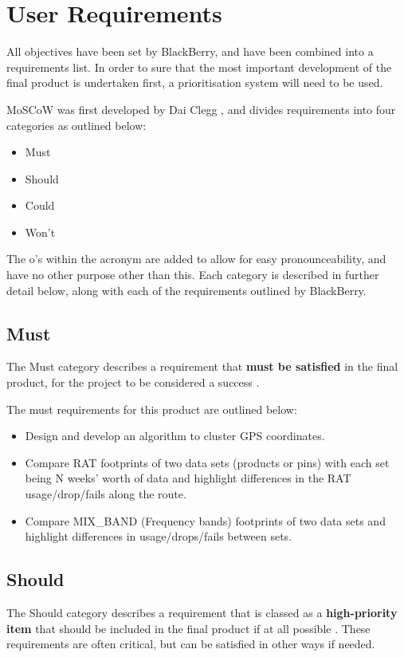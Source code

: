 \section{User Requirements}
\label{sec:userrequirements}
All objectives have been set by BlackBerry, and have been combined into a 
requirements list. In order to sure that the most important development of the 
final product is undertaken first, a prioritisation system will need to be 
used.

MoSCoW was first developed by Dai Clegg \citep{clegg94}, and divides 
requirements into four categories \citep{brennan09} as outlined below:
\begin{itemize}
  \item Must
  \item Should
  \item Could
  \item Won't
\end{itemize}

The o's within the acronym are added to allow for easy pronounceability, and 
have no other purpose other than this. Each category is described in further 
detail below, along with each of the requirements outlined by BlackBerry.


\subsection{Must}
The Must category describes a requirement that {\bfseries must be satisfied} in
the final product, for the project to be considered a success 
\citep{brennan09}. 

The must requirements for this product are outlined below:
\begin{itemize}
  \item Design and develop an algorithm to cluster GPS coordinates.
  \item Compare RAT footprints of two data sets (products or pins) with each 
        set being N weeks’ worth of data and highlight differences in the RAT 
        usage/drop/fails along the route.
  \item Compare MIX\_BAND (Frequency bands) footprints of two data sets and 
        highlight differences in usage/drops/fails between sets.
\end{itemize}


\subsection{Should}
The Should category describes a requirement 
that is classed as a {\bfseries high-priority item} that should be included in 
the final product if at all possible \citep{brennan09}. These requirements are
often critical, but can be satisfied in other ways if needed. 

